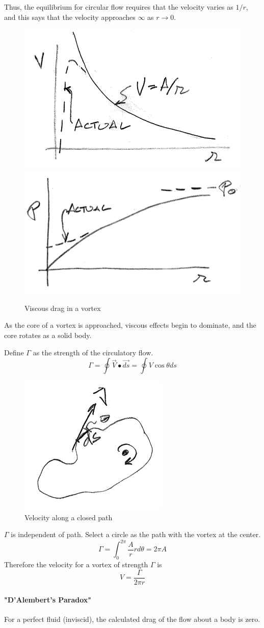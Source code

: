 \documentclass[draft=false, titlepage]{article}
\begin{document}
Thus, the equilibrium for circular flow requires that the velocity varies as $1/r$, and this says that the velocity approaches $\infty$ as $r \rightarrow 0$.
\begin{figure}[ht]
	\centering
	\includegraphics[width=0.3\linewidth]{Figures/p27_vortexViscousDrag1.PNG}
	\includegraphics[width=0.3\linewidth]{Figures/p27_vortexViscousDrag2.PNG}
	\caption{Viscous drag in a vortex}
	\label{fig:vortexViscousDrag1}
\end{figure}
As the core of a vortex is approached, viscous effects begin to dominate, and the core rotates as a solid body.

Define $\Gamma$ as the strength of the circulatory flow.
\begin{equation*}
\Gamma = \oint \vec{V} \bullet \vec{ds} = \oint V\cos\theta ds
\end{equation*}
\begin{figure}[ht]
	\centering
	\includegraphics[width=0.25\linewidth]{Figures/p28_closedPath.PNG}
	\caption{Velocity along a closed path}
	\label{fig:p28_closedPath}
\end{figure}
$\Gamma$ is independent of path. Select a circle as the path with the vortex at the center.
\begin{equation}
\Gamma = \int_0^{2\pi} \frac{A}{r}rd\theta = 2\pi A
\end{equation}
Therefore the velocity for a vortex of strength $\Gamma$ is
\begin{equation}
V = \frac{\Gamma}{2\pi r}
\end{equation}

\paragraph*{"D'Alembert's Paradox"} For a perfect fluid (inviscid), the calculated drag of the flow about a body is zero.
\end{document}
